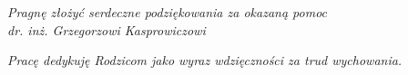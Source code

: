 
\thispagestyle{empty}


\vspace*{18cm}

\begin{flushright}
\emph{Pragnę złożyć serdeczne podziękowania za okazaną pomoc \\ dr. inż. Grzegorzowi Kasprowiczowi} \\ \medskip
\end{flushright}


\medskip

\begin{flushright}
\emph{Pracę dedykuję Rodzicom jako wyraz wdzięczności za trud wychowania. \\ }\smallskip

\end{flushright}